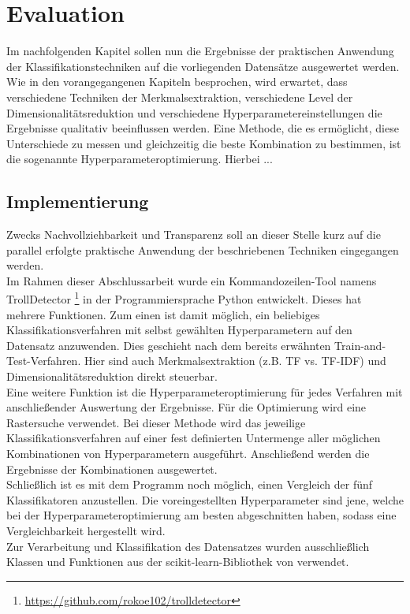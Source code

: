 \section{Evaluation}\raggedbottom
Im nachfolgenden Kapitel sollen nun die Ergebnisse der praktischen Anwendung der Klassifikationstechniken auf die vorliegenden Datensätze ausgewertet werden. Wie in den vorangegangenen Kapiteln besprochen, wird erwartet, dass verschiedene Techniken der Merkmalsextraktion, verschiedene Level der Dimensionalitätsreduktion und verschiedene Hyperparametereinstellungen die Ergebnisse qualitativ beeinflussen werden. Eine Methode, die es ermöglicht, diese Unterschiede zu messen und gleichzeitig die beste Kombination zu bestimmen, ist die sogenannte Hyperparameteroptimierung. Hierbei ...

\subsection{Implementierung} 
Zwecks Nachvollziehbarkeit und Transparenz soll an dieser Stelle kurz auf die parallel erfolgte praktische Anwendung der beschriebenen Techniken eingegangen werden.\\
Im Rahmen dieser Abschlussarbeit wurde ein Kommandozeilen-Tool namens \glqq TrollDetector\grqq{} \footnote{\url{https://github.com/rokoe102/trolldetector}} in der Programmiersprache Python entwickelt. Dieses hat mehrere Funktionen. Zum einen ist damit möglich, ein beliebiges Klassifikationsverfahren mit selbst gewählten Hyperparametern auf den Datensatz anzuwenden. Dies geschieht nach dem bereits erwähnten \glqq Train-and-Test\grqq-Verfahren. Hier sind auch Merkmalsextraktion (z.B. TF vs. TF-IDF) und Dimensionalitätsreduktion direkt steuerbar.\\
Eine weitere Funktion ist die Hyperparameteroptimierung für jedes Verfahren mit anschließender Auswertung der Ergebnisse. Für die Optimierung wird eine Rastersuche verwendet. Bei dieser Methode wird das jeweilige Klassifikationsverfahren auf einer fest definierten Untermenge aller möglichen Kombinationen von Hyperparametern ausgeführt. Anschließend werden die Ergebnisse der Kombinationen ausgewertet.\\
Schließlich ist es mit dem Programm noch möglich, einen Vergleich der fünf Klassifikatoren anzustellen. Die voreingestellten Hyperparameter sind jene, welche bei der Hyperparameteroptimierung am besten abgeschnitten haben, sodass eine Vergleichbarkeit hergestellt wird.\\
Zur Verarbeitung und Klassifikation des Datensatzes wurden ausschließlich Klassen und Funktionen aus der \glqq scikit-learn\grqq-Bibliothek von \citet{scikit-learn} verwendet.
\pagebreak\pagebreak
